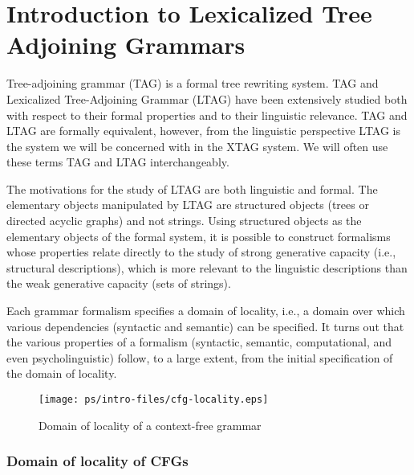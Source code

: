 
\chapter{Introduction to Lexicalized Tree Adjoining Grammars}
\label{intro-FBLTAG}

Tree-adjoining grammar (TAG) is a formal tree rewriting system. TAG and
Lexicalized Tree-Adjoining Grammar (LTAG) have been extensively studied
both with respect to their formal properties and to their linguistic
relevance. TAG and LTAG are formally equivalent, however, from the
linguistic perspective LTAG is the system we will be concerned with in
the XTAG system. We will often use these terms TAG and LTAG
interchangeably.

The motivations for the study of LTAG are both linguistic and formal.
The elementary objects manipulated by LTAG are structured objects
(trees or directed acyclic graphs) and not strings. Using structured
objects as the elementary objects of the formal system, it is possible
to construct formalisms whose properties relate directly to the study
of strong generative capacity (i.e., structural descriptions), which is
more relevant to the linguistic descriptions than the weak generative
capacity (sets of strings).

Each grammar formalism specifies a domain of locality, i.e., a domain
over which various dependencies (syntactic and semantic) can be
specified. It turns out that the various properties of a formalism
(syntactic, semantic, computational, and even psycholinguistic) follow,
to a large extent, from the initial specification of the domain of
locality.

\begin{figure*}[ht] 
\begin{center}
\texttt{[image: ps/intro-files/cfg-locality.eps]}
\caption{\label{cfg} Domain of locality of a context-free grammar}
\end{center}
\end{figure*}

\subsection{Domain of locality of CFGs} 

